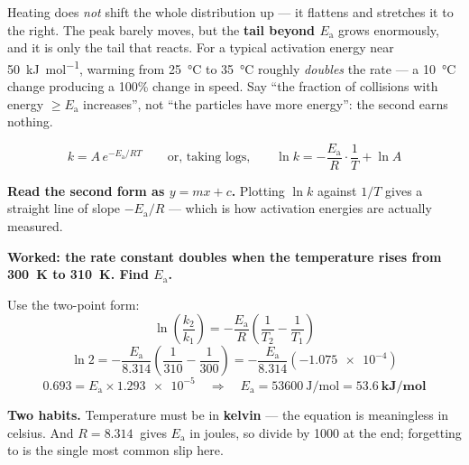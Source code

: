 \documentclass{apchem-worksheet}
\begin{document}
\begin{apcnote}
Heating does \emph{not} shift the whole distribution up --- it flattens
and stretches it to the right. The peak barely moves, but the
\textbf{tail beyond $E_{\mathrm{a}}$} grows enormously, and it is only
the tail that reacts. For a typical activation energy near
\SI{50}{\kilo\joule\per\mole}, warming from \SI{25}{\celsius} to
\SI{35}{\celsius} roughly \emph{doubles} the rate --- a
\SI{10}{\celsius} change producing a 100\% change in speed. Say
``the fraction of collisions with energy $\ge E_{\mathrm{a}}$
increases'', not ``the particles have more energy'': the second earns
nothing.
\end{apcnote}

\begin{workedexample}
\[ k = A\,e^{-E_{\mathrm{a}}/RT}
   \qquad\text{or, taking logs,}\qquad
   \ln k = -\frac{E_{\mathrm{a}}}{R}\cdot\frac{1}{T} + \ln A \]

\textbf{Read the second form as $y = mx + c$.} Plotting $\ln k$ against
$1/T$ gives a straight line of slope $-E_{\mathrm{a}}/R$ --- which is
how activation energies are actually measured.

\begin{center}
\end{center}

\textbf{Worked: the rate constant doubles when the temperature rises
from \SI{300}{\kelvin} to \SI{310}{\kelvin}. Find $E_{\mathrm{a}}$.}

Use the two-point form:
\[ \ln\!\left(\frac{k_{2}}{k_{1}}\right)
   = -\frac{E_{\mathrm{a}}}{R}
     \left(\frac{1}{T_{2}} - \frac{1}{T_{1}}\right) \]
\[ \ln 2 = -\frac{E_{\mathrm{a}}}{8.314}
   \left(\frac{1}{310} - \frac{1}{300}\right)
   = -\frac{E_{\mathrm{a}}}{8.314}\left(\num{-1.075e-4}\right) \]
\[ 0.693 = E_{\mathrm{a}} \times \num{1.293e-5}
   \quad\Longrightarrow\quad
   E_{\mathrm{a}} = \SI{53600}{\joule\per\mole}
   = \mathbf{\SI{53.6}{\kilo\joule\per\mole}} \]

\textbf{Two habits.} Temperature must be in \textbf{kelvin} --- the
equation is meaningless in celsius. And $R = \SI{8.314}{}$ gives
$E_{\mathrm{a}}$ in joules, so divide by 1000 at the end; forgetting to
is the single most common slip here.
\end{workedexample}
\end{document}
